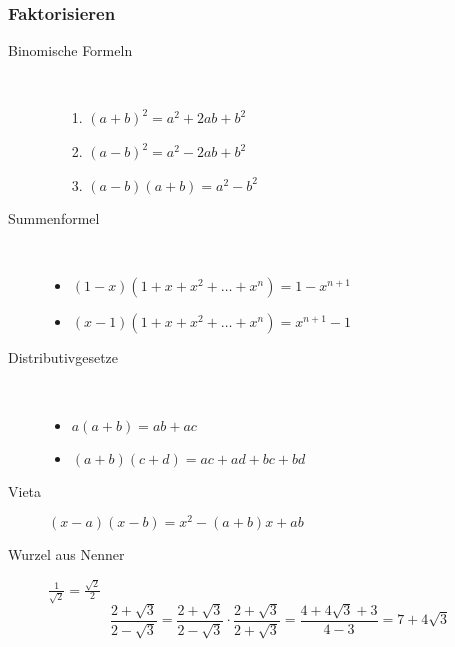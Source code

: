 \subsubsection{Faktorisieren}
\begin{description}
    \item[Binomische Formeln] \
    \begin{itemize}
        \item[1.] $(a+b)^2=a^2+2ab+b^2$
        \item[2.] $(a-b)^2=a^2-2ab+b^2$
        \item[3.] $(a-b)(a+b)=a^2-b^2$
    \end{itemize}
    \item[Summenformel] \
    \begin{itemize}
        \item $(1-x)(1+x+x^2+\dots +x^n)=1-x^{n+1}$
        \item $(x-1)(1+x+x^2+\dots +x^n)=x^{n+1}-1$
    \end{itemize}
    \item[Distributivgesetze] \
    \begin{itemize}
        \item $a(a+b)=ab+ac$
        \item $(a+b)(c+d) = ac +ad + bc +bd$
    \end{itemize}
    \item[Vieta] $(x-a)(x-b) = x^2 - (a+b)x+ab$
    \item[Wurzel aus Nenner] $\frac{1}{\sqrt{2}}=\frac{\sqrt{2}}{2}$
    $$\frac{2+\sqrt{3}}{2-\sqrt{3}}=\frac{2+\sqrt{3}}{2-\sqrt{3}} \cdot \frac{2+\sqrt{3}}{2+\sqrt{3}}=\frac{4+4\sqrt{3}+3}{4-3}=7+4\sqrt{3}$$
\end{description}
